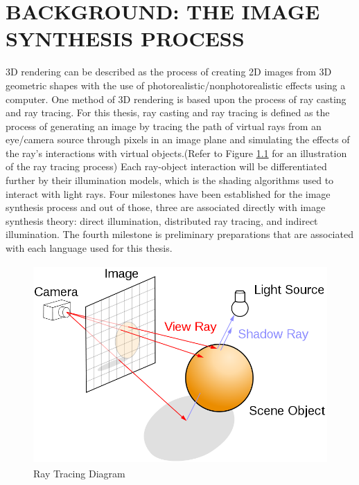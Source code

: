 %
%
%





\chapter{\uppercase {Background: The Image Synthesis Process}}
3D rendering can be described as the process of creating 2D images from 3D geometric shapes with the use of photorealistic/nonphotorealistic effects using a computer. One method of 3D rendering is based upon the process of ray casting and ray tracing.  For this thesis, ray casting and ray tracing is defined as the process of generating an image by tracing the path of virtual rays from an eye/camera source through pixels in an image plane and simulating the effects of the ray's interactions with virtual objects.(Refer to Figure \ref{fig:raytracingdiagram} for an illustration of the ray tracing process)  Each ray-object interaction will be differentiated further by their illumination models, which is the shading algorithms used to interact with light rays. Four milestones have been established for the image synthesis process and out of those, three are associated directly with image synthesis theory: direct illumination, distributed ray tracing, and indirect illumination. The fourth milestone is preliminary preparations that are associated with each language used for this thesis.

\begin{figure}[h]
\centering
\includegraphics[height=3.0in]{figures/Ray_trace_diagram.png}
\caption{Ray Tracing Diagram\cite{RayTracingDiagram}}
\label{fig:raytracingdiagram}
\end{figure}

